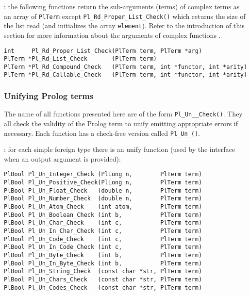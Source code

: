 : the following functions return the sub-arguments
(terms) of complex terms as an array of \texttt{PlTerm} except
\texttt{Pl\_Rd\_Proper\_List\_Check()} which returns the size of the list read
(and initializes the array \texttt{element}). Refer to the introduction of
this section for more information about the arguments of complex functions
.

\begin{Indentation}
\begin{verbatim}
int     Pl_Rd_Proper_List_Check(PlTerm term, PlTerm *arg)
PlTerm *Pl_Rd_List_Check       (PlTerm term)
PlTerm *Pl_Rd_Compound_Check   (PlTerm term, int *functor, int *arity)
PlTerm *Pl_Rd_Callable_Check   (PlTerm term, int *functor, int *arity)
\end{verbatim}
\end{Indentation}

\subsubsection{Unifying Prolog terms}
The name of all functions presented here are of the form
\texttt{Pl\_Un\_\_Check()}. They all check the validity of the
Prolog term to unify emitting appropriate errors if necessary. Each function
has a check-free version called \texttt{Pl\_Un\_()}.

: for each simple foreign type
 there is an unify function (used by the
interface when an output argument is provided):

\begin{Indentation}
\begin{verbatim}
PlBool Pl_Un_Integer_Check (PlLong n,        PlTerm term)
PlBool Pl_Un_Positive_Check(PlLong n,        PlTerm term)
PlBool Pl_Un_Float_Check   (double n,        PlTerm term)
PlBool Pl_Un_Number_Check  (double n,        PlTerm term)
PlBool Pl_Un_Atom_Check    (int atom,        PlTerm term)
PlBool Pl_Un_Boolean_Check (int b,           PlTerm term)
PlBool Pl_Un_Char_Check    (int c,           PlTerm term)
PlBool Pl_Un_In_Char_Check (int c,           PlTerm term)
PlBool Pl_Un_Code_Check    (int c,           PlTerm term)
PlBool Pl_Un_In_Code_Check (int c,           PlTerm term)
PlBool Pl_Un_Byte_Check    (int b,           PlTerm term)
PlBool Pl_Un_In_Byte_Check (int b,           PlTerm term)
PlBool Pl_Un_String_Check  (const char *str, PlTerm term)
PlBool Pl_Un_Chars_Check   (const char *str, PlTerm term)
PlBool Pl_Un_Codes_Check   (const char *str, PlTerm term)
\end{verbatim}
\end{Indentation}

